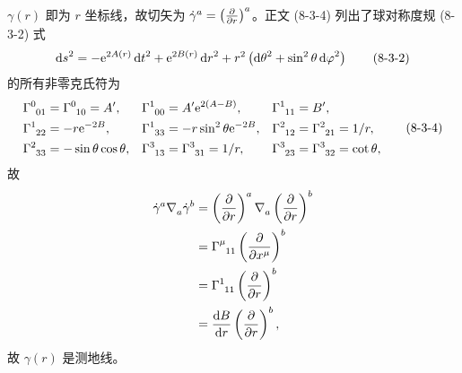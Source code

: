 \begin{xiti}
    \begin{zm}
        $\gamma(r)$ 即为 $r$ 坐标线，故切矢为 $\tensor{\dot{\gamma}}{^a} = \tensor{\left( \pdv{r} \right)}{^a}$。正文 (8-3-4) 列出了球对称度规 (8-3-2) 式
        \begin{equation*}
            {\dd{s}}^2 = - \mathrm{e}^{2A(r)} \dd{t}^2 + \mathrm{e}^{2B(r)} \dd{r}^2 + r^2 \left( \dd{\theta}^2 + \sin^2 \theta \dd{\varphi}^2 \right) \tag{8-3-2}
        \end{equation*}
        的所有非零克氏符为
        \begin{equation*}
            \begin{aligned}
                \ChristoffelSymbol{0}{0}{1} &= \ChristoffelSymbol{0}{1}{0} = A', & \ChristoffelSymbol{1}{0}{0} &= A' \e{2(A-B)}, & \ChristoffelSymbol{1}{1}{1} &= B',\\
                \ChristoffelSymbol{1}{2}{2} &= - r \e{-2B}, & \ChristoffelSymbol{1}{3}{3} &= - r \sin^2 \theta \e{-2B}, & \ChristoffelSymbol{2}{1}{2} &= \ChristoffelSymbol{2}{2}{1} = 1/r,\\
                \ChristoffelSymbol{2}{3}{3} &= - \sin \theta \cos \theta, & \ChristoffelSymbol{3}{1}{3} &= \ChristoffelSymbol{3}{3}{1} = 1/r, & \ChristoffelSymbol{3}{2}{3} &= \ChristoffelSymbol{3}{3}{2} = \cot \theta,
            \end{aligned}
            \tag{8-3-4}
        \end{equation*}
        故
        \begin{equation*}
            \begin{split}
                \tensor{\dot{\gamma}}{^a} \Nabla{a} \tensor{\dot{\gamma}}{^b} &= \tensor{\left( \pdv{r} \right)}{^a} \Nabla{a} \tensor{\left( \pdv{r} \right)}{^b}\\
                &= \ChristoffelSymbol{\mu}{1}{1} \tensor{\left( \pdv{x^\mu} \right)}{^b}\\
                &= \ChristoffelSymbol{1}{1}{1} \tensor{\left( \pdv{r} \right)}{^b}\\
                &= \dv{B}{r} \tensor{\left( \pdv{r} \right)}{^b},
            \end{split}
        \end{equation*}
        故 $\gamma(r)$ 是测地线。
    \end{zm}
    
\end{xiti}
